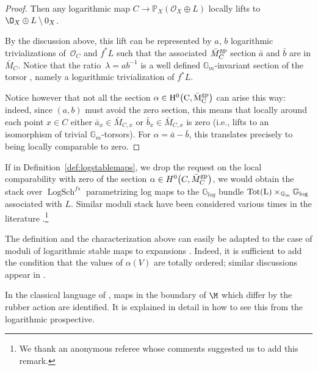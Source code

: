 \begin{proof}
Then any logarithmic map $C\to \mathbb P_X(\mathcal O_X\oplus L)$ locally lifts to $\O_X\oplus L\setminus 0_X$.

By the discussion above, this lift can be represented by $a$, $b$ logarithmic trivializations of~$\mathcal O_C$ and $f^*L$ such that the associated $\bar{M}_C^{\rm gp}$ section $\bar{a}$ and $\bar{b}$ are in $\bar{M}_C$. Notice that the ratio~${\lambda=ab^{-1}}$ is a well defined $\mathbb G_m$-invariant section of the torsor , namely a logarithmic trivialization of $f^*L$.

Notice however that not all the section $\alpha\in \rm{H}^0\bigl(C,\bar{M}_{C}^{\rm gp}\bigr)$ can arise this way: indeed, since $(a,b)$ must avoid the zero section, this means that locally around each point $x\in C$ either $\bar{a}_x\in \bar{M}_{C,x} $ or $\bar{b}_x\in\bar{M}_{C,x}$ is zero (i.e., lifts to an isomorphism of trivial $\mathbb G_m$-torsors). For $\alpha=\bar{a}-\bar{b}$, this translates precisely to being locally comparable to zero.
\end{proof}

\begin{remarkk}
If in Definition~\ref{def:logstablemaps}, we drop the request on the local comparability with zero of the section $\alpha\in H^0\bigl(C,\bar{M}_C^{\rm gp}\bigr)$, we would obtain the stack over $\operatorname{LogSch}^{fs}$ parametrizing log maps to the $\mathbb G_{log}$ bundle $\rm{Tot}(L)\times_{\mathbb G_m}\mathbb G_{log}$ associated with $L$. Similar moduli stack have been considered various times in the literature \cite{marcuswiselog,ranganathan2024logarithmic,RSPW2,ranganathan2020rational}.\footnote{We thank an anonymous referee whose comments suggested us to add this remark.}
\end{remarkk}

\begin{remarkk}
The definition and the characterization above can easily be adapted to the case of moduli of logarithmic stable maps to expansions \cite{kim2010logarithmic,li2001stable,maulik2023logarithmic}. Indeed, it is sufficient to add the condition that the values of $\alpha(V)$ are totally ordered; similar discussions appear in \cite{marcuswiselog,ranganathan2024logarithmic}.

In the classical language of \cite{li2001stable}, maps in the boundary of $\M$ which differ by the rubber action are identified. It is explained in detail in \cite{CN} how to see this from the logarithmic prospective.
\end{remarkk}

